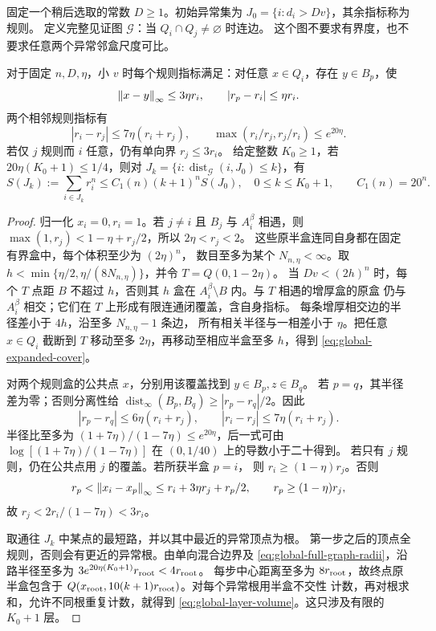 固定一个稍后选取的常数 \(D\ge1\)。初始异常集为
\(J_0=\{i:d_i>Dv\}\)，其余指标称为规则。
定义完整见证图 \(\mathcal G\)：当 \(Q_i\cap Q_j\ne\varnothing\) 时连边。
这个图不要求有界度，也不要求任意两个异常邻盒尺度可比。

\begin{lemma}[完整见证图的有限层增长]\label{lem:global-full-graph}
对于固定 \(n,D,\eta\)，小 \(v\) 时每个规则指标满足：对任意
\(x\in Q_i\)，存在 \(y\in B_p\)，使
\begin{equation}\label{eq:global-expanded-cover}
 \left\lVert x-y\right\rVert_\infty\le3\eta r_i,\qquad |r_p-r_i|\le\eta r_i.
\end{equation}
两个相邻规则指标有
\begin{equation}\label{eq:global-full-graph-radii}
 |r_i-r_j|\le7\eta(r_i+r_j),\qquad
 \max(r_i/r_j,r_j/r_i)\le e^{20\eta}.
\end{equation}
若仅 \(j\) 规则而 \(i\) 任意，仍有单向界 \(r_j\le3r_i\)。
给定整数 \(K_0\ge1\)，若 \(20\eta(K_0+1)\le1/4\)，则对
\(J_k=\{i:\operatorname{dist}_{\mathcal G}(i,J_0)\le k\}\)，有
\begin{equation}\label{eq:global-layer-volume}
 S(J_k):=\sum_{i\in J_k}r_i^n
 \le C_1(n)(k+1)^n S(J_0),\quad 0\le k\le K_0+1,
 \qquad C_1(n)=20^n.
\end{equation}
\end{lemma}
\begin{proof}
归一化 \(x_i=0,r_i=1\)。若 \(j\ne i\) 且 \(B_j\) 与
\(A_i^\beta\) 相遇，则
\(\max(1,r_j)<1-\eta+r_j/2\)，所以 \(2\eta<r_j<2\)。
这些原半盒连同自身都在固定有界盒中，每个体积至少为 \((2\eta)^n\)，
数目至多为某个 \(N_{n,\eta}<\infty\)。取
\(h<\min\{\eta/2,\eta/(8N_{n,\eta})\}\)，并令 \(T=Q(0,1-2\eta)\)。
当 \(Dv<(2h)^n\) 时，每个 \(T\) 点距 \(B\) 不超过 \(h\)，否则其
\(h\) 盒在 \(A_i^\beta\setminus B\) 内。与 \(T\) 相遇的增厚盒的原盒
仍与 \(A_i^\beta\) 相交；它们在 \(T\) 上形成有限连通闭覆盖，含自身指标。
每条增厚相交边的半径差小于 \(4h\)，沿至多 \(N_{n,\eta}-1\) 条边，
所有相关半径与一相差小于 \(\eta\)。把任意 \(x\in Q_i\) 截断到 \(T\)
移动至多 \(2\eta\)，再移动至相应半盒至多 \(h\)，得到
\eqref{eq:global-expanded-cover}。

对两个规则盒的公共点 \(x\)，分别用该覆盖找到 \(y\in B_p,z\in B_q\)。
若 \(p=q\)，其半径差为零；否则分离性给
\(\operatorname{dist}_\infty(B_p,B_q)\ge|r_p-r_q|/2\)。因此
\[
 |r_p-r_q|\le6\eta(r_i+r_j),\qquad
 |r_i-r_j|\le7\eta(r_i+r_j).
\]
半径比至多为 \((1+7\eta)/(1-7\eta)\le e^{20\eta}\)，后一式可由
\(\log[(1+7\eta)/(1-7\eta)]\) 在 \((0,1/40)\) 上的导数小于二十得到。
若只有 \(j\) 规则，仍在公共点用 \(j\) 的覆盖。若所获半盒 \(p=i\)，
则 \(r_i\ge(1-\eta)r_j\)。否则
\[
 r_p<\left\lVert x_i-x_p\right\rVert_\infty\le r_i+3\eta r_j+r_p/2,
 \qquad r_p\ge(1-\eta)r_j,
\]
故 \(r_j<2r_i/(1-7\eta)<3r_i\)。

取通往 \(J_k\) 中某点的最短路，并以其中最近的异常顶点为根。
第一步之后的顶点全规则，否则会有更近的异常根。由单向混合边界及
\eqref{eq:global-full-graph-radii}，沿路半径至多为
\(3e^{20\eta(K_0+1)}r_{\rm root}<4r_{\rm root}\)。
每步中心距离至多为 \(8r_{\rm root}\)，故终点原半盒包含于
\(Q(x_{\rm root},10(k+1)r_{\rm root})\)。对每个异常根用半盒不交性
计数，再对根求和，允许不同根重复计数，就得到
\eqref{eq:global-layer-volume}。这只涉及有限的 \(K_0+1\) 层。
\end{proof}

